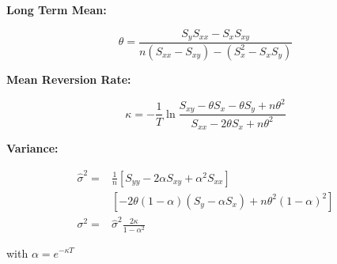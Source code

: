 \textbf{Long Term Mean:}

$$
	\theta=\frac{S_y S_{x x}-S_x S_{x y}}{n\left(S_{x x}-S_{x y}\right)-\left(S_x^2-S_x S_y\right)}
$$

\textbf{Mean Reversion Rate:}

$$
	\kappa=-\frac{1}{T} \ln \frac{S_{x y}-\theta S_x-\theta S_y+n \theta^2}{S_{x x}-2 \theta S_x+n \theta^2}
$$

\textbf{Variance:}

$$
\begin{aligned}
    \hat{\sigma}^2= & \frac{1}{n}\left[S_{y y}-2 \alpha S_{x y}+\alpha^2 S_{x x}\right] \\    
    & \left[-2 \theta(1-\alpha)\left(S_y-\alpha S_x\right)+n \theta^2(1-\alpha)^2\right] \\    
    \sigma^2= & \hat{\sigma}^2 \frac{2 \kappa}{1-\alpha^2}    
    \end{aligned}  
$$

with $\alpha=e^{-\kappa T}$

